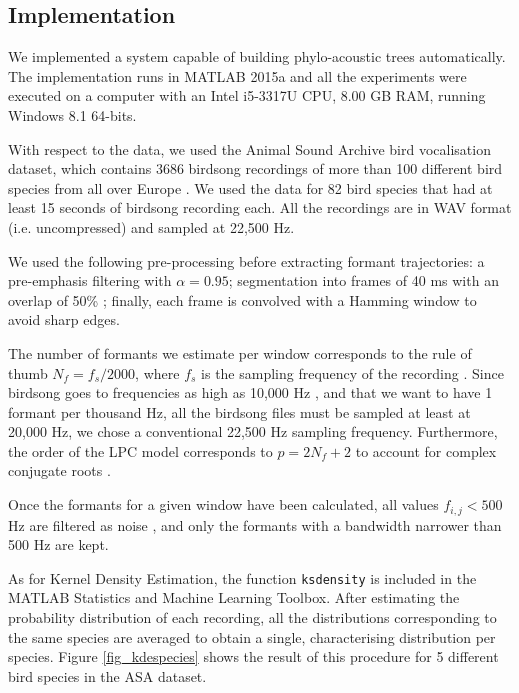 \documentclass[pdftex,11pt,a4paper]{article}
\theoremstyle{definition}
\theoremstyle{remark}
\begin{document}
\subsection{Implementation}
We implemented a system capable of building phylo-acoustic trees automatically. The implementation runs in MATLAB 2015a and all the experiments were executed on a computer with an Intel i5-3317U CPU, 8.00 GB RAM, running Windows 8.1 64-bits. 
\par With respect to the data, we used the Animal Sound Archive bird vocalisation dataset, which contains 3686 birdsong recordings of more than 100 different bird species from all over Europe \cite{AnimalSoundArchive2015}. We used the data for 82 bird species that had at least 15 seconds of birdsong recording each. All the recordings are in WAV format (i.e. uncompressed) and sampled at 22,500 Hz.
\par We used the following pre-processing before extracting formant trajectories: a pre-emphasis filtering with $\alpha = 0.95$; segmentation into frames of 40 ms with an overlap of 50\% \cite{Stowell2014}; finally, each frame is convolved with a Hamming window to avoid sharp edges. 
\par The number of formants we estimate per window corresponds to the rule of thumb $N_f = f_s / 2000$, where $f_s$ is the sampling frequency of the recording \cite{markel1976}. Since birdsong goes to frequencies as high as 10,000 Hz \cite{Marler2004}, and that we want to have 1 formant per thousand Hz, all the birdsong files must be sampled at least at 20,000 Hz, we chose a conventional 22,500 Hz sampling frequency. Furthermore, the order of the LPC model corresponds to $p = 2N_f + 2$ to account for complex conjugate roots \cite{Benesty}. 
\par Once the formants for a given window have been calculated, all values $f_{i, j} < 500$ Hz are filtered as noise \cite{Stowell2014}, and only the formants with a bandwidth narrower than 500 Hz are kept. 
\par As for Kernel Density Estimation, the function \texttt{ksdensity} is included in the MATLAB Statistics and Machine Learning Toolbox. After estimating the probability distribution of each recording, all the distributions corresponding to the same species are averaged to obtain a single, characterising distribution per species. Figure \ref{fig_kdespecies} shows the result of this procedure for 5 different bird species in the ASA dataset.
\end{document}
